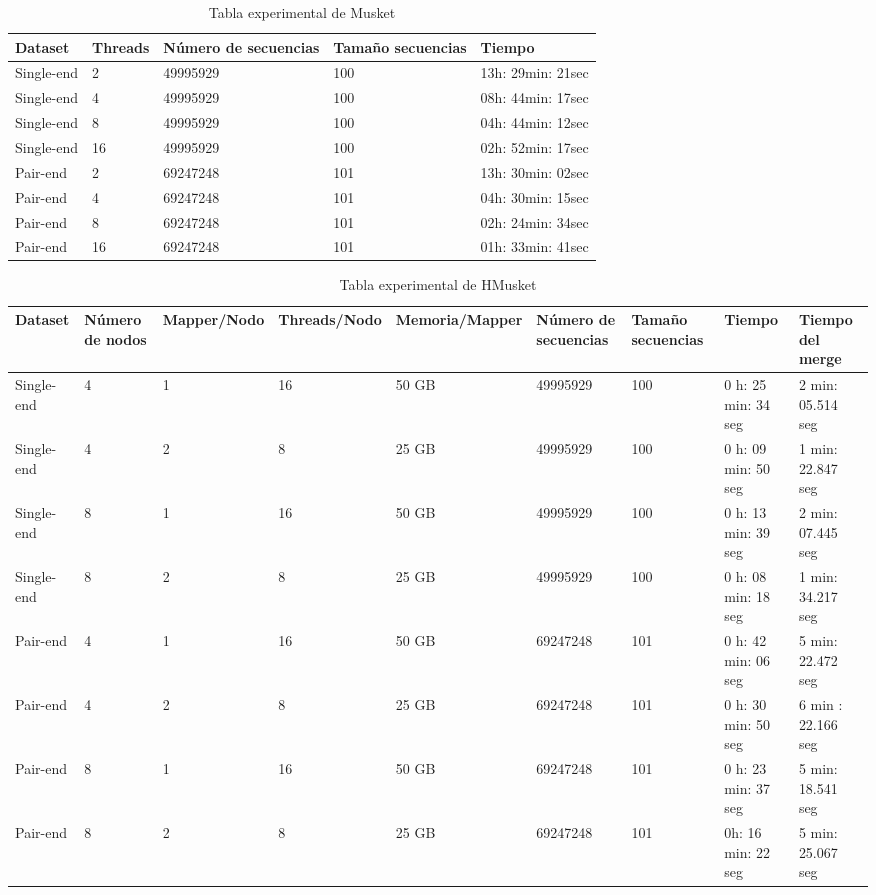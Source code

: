 \documentclass[conference]{IEEEtran}
\begin{document}
\begin{table}[t]
	\centering
	\begin{tabular}{|l|l|p{1.5cm}|p{1.3cm}|l|}
		\hline
		\textbf{Dataset} 	& \textbf{Threads} 	& \textbf{Número de secuencias} & \textbf{Tamaño secuencias} & \textbf{Tiempo}	\\ \hline
		Single-end 	& 2			& 49995929           & 100           & 13h: 29min: 21sec 	\\ \hline
		Single-end 	& 4			& 49995929           & 100           & 08h: 44min: 17sec	\\ \hline
		Single-end 	& 8			& 49995929           & 100           & 04h: 44min: 12sec 	\\ \hline
		Single-end 	& 16		& 49995929           & 100           & 02h: 52min: 17sec 	\\ \hline \hline
		Pair-end 	& 2			& 69247248           & 101           & 13h: 30min: 02sec 	\\ \hline
		Pair-end 	& 4			& 69247248           & 101           & 04h: 30min: 15sec	\\ \hline
		Pair-end 	& 8			& 69247248           & 101           & 02h: 24min: 34sec 	\\ \hline
		Pair-end 	& 16		& 69247248           & 101           & 01h: 33min: 41sec 	\\ \hline
	\end{tabular}
	\caption{Tabla experimental de Musket}
	\label{musket_experiment_result}
\end{table}

\begin{table}[]
	\begin{tabular}{|p{1.3cm}|p{1cm}|l|l|l|p{1.5cm}|p{1.3cm}|p{2.2cm}|p{2.2cm}|}
		\hline
		\textbf{Dataset} &	\textbf{Número de nodos} & \textbf{Mapper/Nodo} & \textbf{Threads/Nodo} & \textbf{Memoria/Mapper} & \textbf{Número de secuencias} & \textbf{Tamaño secuencias} & \textbf{Tiempo} & \textbf{Tiempo del merge}	\\ \hline
		Single-end &	4 & 1 & 16 & 50 GB & 49995929 & 100 & 0 h: 25 min: 34 seg	& 2 min: 05.514 seg	\\ \hline
		Single-end &	4 & 2 & 8 & 25 GB & 49995929 & 100 & 0 h: 09 min: 50 seg	& 1 min: 22.847 seg	\\ \hline
		Single-end &	8 & 1 & 16 & 50 GB & 49995929 & 100 & 0 h: 13 min: 39 seg	& 2 min: 07.445 seg	\\ \hline
		Single-end &	8 & 2 & 8 & 25 GB & 49995929 & 100 & 0 h: 08 min: 18 seg	& 1 min: 34.217 seg	\\ \hline \hline
		Pair-end &	4 & 1 & 16 & 50 GB & 69247248 & 101 & 0 h: 42 min: 06 seg	& 5 min: 22.472 seg	\\ \hline
		Pair-end &	4 & 2 & 8 & 25 GB & 69247248 & 101 & 0 h: 30 min: 50 seg	& 6 min : 22.166 seg	\\ \hline
		Pair-end &	8 & 1 & 16 & 50 GB & 69247248 & 101 & 0 h: 23 min: 37 seg	& 5 min: 18.541 seg	\\ \hline
		Pair-end &	8 & 2 & 8 & 25 GB & 69247248 & 101 & 0h: 16 min: 22 seg	& 5 min: 25.067 seg \\ \hline
	\end{tabular}
	\caption{Tabla experimental de HMusket}
	\label{hmusket_experiment_result}
\end{table}
\end{document}
